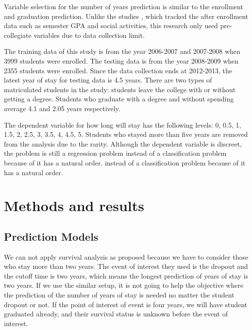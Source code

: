 \documentclass[12pt,english]{report}
\begin{document}
Variable selection for the number of years prediction is similar to the
enrollment
and graduation prediction. Unlike the studies \citep{Lin2009,
deberard2004predictors,
dekker2009}, which tracked the after enrollment data such as semester GPA and
social activities,
this research only used pre-collegiate variables due to data collection limit.

The training data of this study is from the year 2006-2007 and 2007-2008 when
3999 
students were enrolled. The testing data is from the year 2008-2009 when 2355
students 
were enrolled. Since the data collection ends at 2012-2013, the latest year of
stay for
testing data is 4.5 years. There are two types of matriculated students in the
study: 
students leave the college with or without getting a degree. Students who
graduate
with a degree and without spending average 4.1 and 2.05 years respectively.

The dependent variable for how long will stay has the following levels: 0, 0.5,
1, 
1.5, 2, 2.5, 3, 3.5, 4, 4.5, 5. Students who stayed more than five years are
removed
from the analysis due to the rarity. Although the dependent variable is
discreet, 
the problem is still a regression problem instead of a classification problem
because
of it has a natural order.
% 
% 
% 
instead of a classification problem because of it has a natural order.
% 
% 
% 
% 

\section{Methods and results}
\subsection{Prediction Models}

We can not apply survival analysis as \citep{Ameri2016} proposed because we
have to consider 
those who stay more than two years. The event of interest they used is the
dropout and the
cutoff time is two years, which means the longest prediction of years of stay
is two years.
If we use the similar setup, it is not going to help the objective where the
prediction of
the number of years of stay is needed no matter the student dropout or not. If
the point 
of interest of event is four years, we will have student graduated already, and
their survival
status is unknown before the event of interest.
\end{document}

